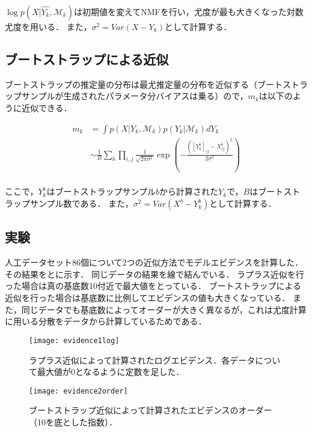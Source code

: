 $\log p(X | \hat{Y_k}, \mathcal{M}_k)$は初期値を変えてNMFを行い，尤度が最も大きくなった対数尤度を用いる．
また，$\sigma^2 = Var(X - Y_k)$として計算する．

\subsection{ブートストラップによる近似}
ブートストラップの推定量の分布は最尤推定量の分布を近似する（ブートストラップサンプルが生成されたパラメータ分バイアスは乗る）ので，$m_k$は以下のように近似できる．

\begin{align}
	m_k &= \int p(X | Y_k, \mathcal{M}_k) p(Y_k| \mathcal{M}_k) dY_k \\
	&\sim \frac{1}{B} \sum_b \prod_{i,j} \frac{1}{\sqrt{2 \pi \sigma^2}} \exp\left(-\frac{([Y_k^b]_{ij} - X^b_{ij})^2}{2 \sigma^2} \right) \\
	\label{eq:simm2}
\end{align}

ここで，$Y_k^b$はブートストラップサンプル$b$から計算された$Y_k$で，$B$はブートストラップサンプル数である．
また，$\sigma^2 = Var(X^b - Y^b_k)$として計算する．

\subsection{実験}
人工データセット86個について2つの近似方法でモデルエビデンスを計算した．
その結果をとに示す．
同じデータの結果を線で結んでいる．
ラプラス近似を行った場合は真の基底数10付近で最大値をとっている．
ブートストラップによる近似を行った場合は基底数に比例してエビデンスの値も大きくなっている．
また，同じデータでも基底数によってオーダーが大きく異なるが，これは尤度計算に用いる分散をデータから計算しているためである．

\begin{figure}[htbp]
    \begin{minipage}{0.5\hsize}
			\begin{center}
					\texttt{[image: evidence1log]}
					\caption{ラプラス近似によって計算されたログエビデンス．各データについて最大値が0となるように定数を足した．}
					\label{fig:evidence1}
			\end{center}
		\end{minipage}
    \begin{minipage}{0.5\hsize}
			\begin{center}
					\texttt{[image: evidence2order]}
					\caption{ブートストラップ近似によって計算されたエビデンスのオーダー（10を底とした指数）．}
					\label{fig:evidence2}
			\end{center}
		\end{minipage}
\end{figure}

